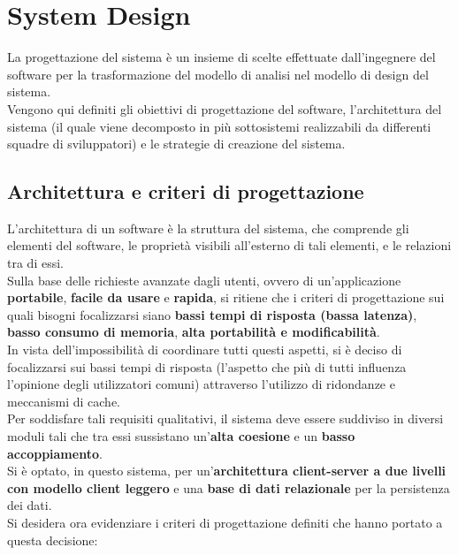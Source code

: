 
\chapter{System Design}
    La progettazione del sistema è un insieme di scelte effettuate dall'ingegnere del software per la trasformazione del modello di analisi nel modello di design del sistema. \\
    Vengono qui definiti gli obiettivi di progettazione del software, l'architettura del sistema (il quale viene decomposto in più sottosistemi realizzabili da differenti squadre di sviluppatori) e le strategie di creazione del sistema.

    \section{Architettura e criteri di progettazione}
        L'architettura di un software è la struttura del sistema, che comprende gli elementi del software, le proprietà visibili all'esterno di tali elementi, e le relazioni tra di essi. \\
        Sulla base delle richieste avanzate dagli utenti, ovvero di un’applicazione \textbf{portabile}, \textbf{facile da usare} e \textbf{rapida}, si ritiene che i criteri di progettazione sui quali bisogni focalizzarsi siano \textbf{bassi tempi di risposta (bassa latenza)}, \textbf{basso consumo di memoria}, \textbf{alta portabilità e modificabilità}. \\
        In vista dell'impossibilità di coordinare tutti questi aspetti, si è deciso di focalizzarsi sui bassi tempi di risposta (l'aspetto che più di tutti influenza l'opinione degli utilizzatori comuni) attraverso l'utilizzo di ridondanze e meccanismi di cache. \\
        Per soddisfare tali requisiti qualitativi, il sistema deve essere suddiviso in diversi moduli tali che tra essi sussistano un'\textbf{alta coesione} e un \textbf{basso accoppiamento}. \\
        Si è optato, in questo sistema, per un'\textbf{architettura client-server a due livelli con modello client leggero} e una \textbf{base di dati relazionale} per la persistenza dei dati. \\
        Si desidera ora evidenziare i criteri di progettazione definiti che hanno portato a questa decisione:
